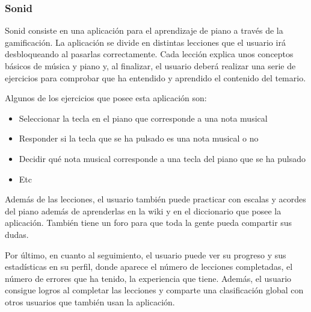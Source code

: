\subsubsection{Sonid}
Sonid consiste en una aplicación para el aprendizaje de piano a través de la gamificación.
La aplicación se divide en distintas lecciones que el usuario irá desbloqueando al pasarlas correctamente.
Cada lección explica unos conceptos básicos de música y piano y, al finalizar, el usuario deberá realizar una serie
de ejercicios para comprobar que ha entendido y aprendido el contenido del temario.

Algunos de los ejercicios que posee esta aplicación son:
\begin{itemize}
    \item Seleccionar la tecla en el piano que corresponde a una nota musical
    \item Responder si la tecla que se ha pulsado es una nota musical o no
    \item Decidir qué nota musical corresponde a una tecla del piano que se ha pulsado
    \item Etc 
\end{itemize}

Además de las lecciones, el usuario también puede practicar con escalas y acordes del piano además de aprenderlas en la wiki y en el diccionario que 
posee la aplicación. También tiene un foro para que toda la gente pueda compartir sus dudas.

Por último, en cuanto al seguimiento, el usuario puede ver su progreso y sus estadísticas en su perfil, donde aparece el número de lecciones
completadas, el número de errores que ha tenido, la experiencia que tiene. Además, el usuario consigue logros al completar las lecciones y 
comparte una clasificación global con otros usuarios que también usan la aplicación.


